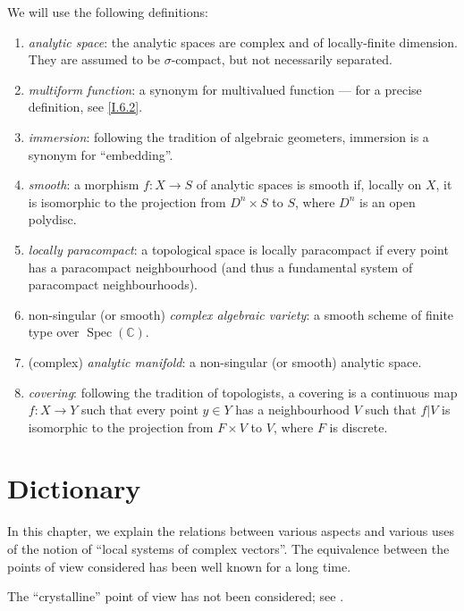 \documentclass{report}
\theoremstyle{plain}
\theoremstyle{definition}
\DeclareMathOperator{\Spec}{Spec}
\newcommand{\oldpage}[1]{\marginpar{\footnotesize$\Big\vert$ \textit{p.~#1}}}
\begin{document}
We will use the following definitions:
\begin{enumerate}[({0.}1)]
  \item\label{0.1}
    \emph{analytic space}:
    the analytic spaces are complex and of locally-finite dimension.
    They are assumed to be $\sigma$-compact, but not necessarily separated.
  \item\label{0.2}
    \emph{multiform function}:
    a synonym for multivalued function --- for a precise definition, see \cref{I.6.2}.
  \item\label{0.3}
    \emph{immersion}:
    following the tradition of algebraic geometers, immersion is a synonym for ``embedding''.
  \item\label{0.4}
    \emph{smooth}:
    a morphism $f\colon X\to S$ of analytic spaces is smooth if, locally on $X$, it is isomorphic to the projection from $D^n\times S$ to $S$, where $D^n$ is an open polydisc.
  \item\label{0.5}
    \emph{locally paracompact}:
    a topological space is locally paracompact if every point has a paracompact neighbourhood (and thus a fundamental system of paracompact neighbourhoods).
  \item\label{0.6}
    non-singular (or smooth) \emph{complex algebraic variety}:
    a smooth scheme of finite type over $\Spec(\mathbb{C})$.
  \item\label{0.7}
    (complex) \emph{analytic manifold}:
    a non-singular (or smooth) analytic space.
  \item\label{0.8}
    \emph{covering}:
    following the tradition of topologists, a covering is a continuous map $f\colon X\to Y$ such that every point $y\in Y$ has a neighbourhood $V$ such that $f|V$ is isomorphic to the projection from $F\times V$ to $V$, where $F$ is discrete.
\end{enumerate}


\renewcommand{\thechapter}{\Roman{chapter}}

\chapter{Dictionary}
\label{I}

\oldpage{3}
In this chapter, we explain the relations between various aspects and various uses of the notion of ``local systems of complex vectors''.
The equivalence between the points of view considered has been well known for a long time.

The ``crystalline'' point of view has not been considered;
see \cite{4,10}.
\end{document}
